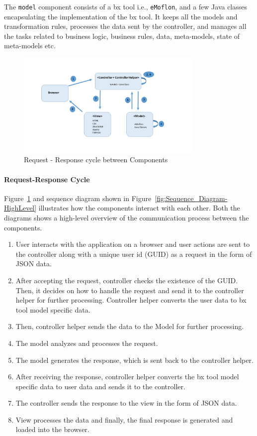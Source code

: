 The \texttt{model} component consists of a bx tool i.e., \texttt{eMoflon}, and a few Java classes encapsulating the implementation of the bx tool. It keeps all the models and transformation rules, processes the data sent by the controller, and manages all the tasks related to business logic, business rules, data, meta-models, state of meta-models etc.

\begin{figure}
	\includegraphics[width=0.8\textwidth]{figures/MVC_ReqRes}
	\caption{Request - Response cycle between Components}
	\label{fig:MVC_ReqRes}
\end{figure}

\paragraph{Request-Response Cycle} 
Figure~\ref{fig:MVC_ReqRes} and sequence diagram shown in Figure~\ref{fig:Sequence_Diagram-HighLevel} illustrates how the components interact with each other. Both the diagrams shows a high-level overview of the communication process between the components.
\begin{enumerate}
	\item {User interacts with the application on a browser and user actions are sent to the controller along with a unique user id (GUID) as a request in the form of JSON data.}
	\item {After accepting the request, controller checks the existence of the GUID. Then, it decides on how to handle the request and send it to the controller helper for further processing. Controller helper converts the user data to bx tool model specific data.}
	\item {Then, controller helper sends the data to the Model for further processing.}
	\item {The model analyzes and processes the request.}
	\item {The model generates the response, which is sent back to the controller helper.}
	\item {After receiving the response, controller helper converts the bx tool model specific data to user data and sends it to the controller.}
	\item {The controller sends the response to the view in the form of JSON data.}
	\item {View processes the data and finally, the final response is generated and loaded into the browser.}
\end{enumerate}

